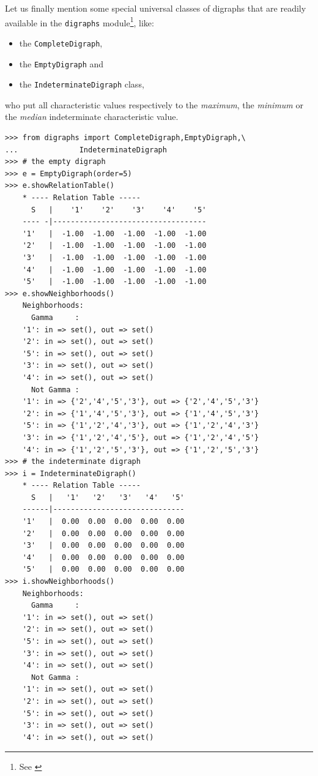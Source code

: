 Let us finally mention some special universal classes of digraphs that are readily available in the \texttt{digraphs} module\footnote{See \citealp{BIS-2021}}, like:
\begin{itemize}[nosep]
\item the \texttt{CompleteDigraph},
\item  the \texttt{EmptyDigraph} and
\item  the \texttt{IndeterminateDigraph} class,
\end{itemize}
who put all characteristic values respectively to the \emph{maximum}, the \emph{minimum} or the \emph{median} indeterminate characteristic value.
\begin{lstlisting}[caption={Complete, empty and indeterminate digraphs},label=list:2.11]
>>> from digraphs import CompleteDigraph,EmptyDigraph,\
...   			 IndeterminateDigraph
>>> # the empty digraph   
>>> e = EmptyDigraph(order=5)
>>> e.showRelationTable()
    * ---- Relation Table -----
      S   |    '1'    '2'    '3'    '4'	   '5'	  
    ---- -|-----------------------------------
    '1'   |  -1.00  -1.00  -1.00  -1.00	 -1.00	 
    '2'   |  -1.00  -1.00  -1.00  -1.00	 -1.00	 
    '3'   |  -1.00  -1.00  -1.00  -1.00	 -1.00	 
    '4'   |  -1.00  -1.00  -1.00  -1.00	 -1.00	 
    '5'   |  -1.00  -1.00  -1.00  -1.00	 -1.00
>>> e.showNeighborhoods() 
    Neighborhoods:
      Gamma     :
    '1': in => set(), out => set()
    '2': in => set(), out => set()
    '5': in => set(), out => set()
    '3': in => set(), out => set()
    '4': in => set(), out => set()
      Not Gamma :
    '1': in => {'2','4','5','3'}, out => {'2','4','5','3'}
    '2': in => {'1','4','5','3'}, out => {'1','4','5','3'}
    '5': in => {'1','2','4','3'}, out => {'1','2','4','3'}
    '3': in => {'1','2','4','5'}, out => {'1','2','4','5'}
    '4': in => {'1','2','5','3'}, out => {'1','2','5','3'}
>>> # the indeterminate digraph
>>> i = IndeterminateDigraph()
    * ---- Relation Table -----
      S   |   '1'   '2'	  '3'	'4'   '5'	  
    ------|------------------------------
    '1'   |  0.00  0.00	 0.00  0.00  0.00	 
    '2'   |  0.00  0.00	 0.00  0.00  0.00	 
    '3'   |  0.00  0.00	 0.00  0.00  0.00	 
    '4'   |  0.00  0.00	 0.00  0.00  0.00	 
    '5'   |  0.00  0.00	 0.00  0.00  0.00	 
>>> i.showNeighborhoods()
    Neighborhoods:
      Gamma     :
    '1': in => set(), out => set()
    '2': in => set(), out => set()
    '5': in => set(), out => set()
    '3': in => set(), out => set()
    '4': in => set(), out => set()
      Not Gamma :
    '1': in => set(), out => set()
    '2': in => set(), out => set()
    '5': in => set(), out => set()
    '3': in => set(), out => set()
    '4': in => set(), out => set()
\end{lstlisting}

